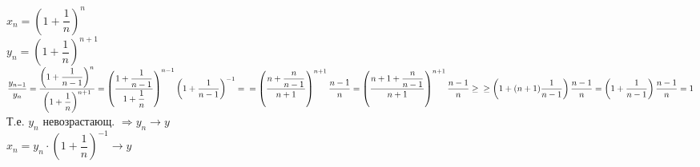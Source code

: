 $ x_n = \left(1 + \dfrac{1}{n}\right)^n $\\
$ y_n =  \left(1 + \dfrac{1}{n}\right)^{n+1} $ \\
$ \dfrac{y_{n-1}}{y_n} = \dfrac{ \left(1 + \dfrac{1}{n-1}\right)^{n}}{ \left(1 + \dfrac{1}{n}\right)^{n+1}} = \left( \dfrac{1+\dfrac{1}{n-1}}{1 + \dfrac{1}{n}} \right)^{n-1} \left( 1 + \dfrac{1}{n-1} \right)^{-1}  = \\ = \left( \dfrac{n+\dfrac{n}{n-1}}{n + 1} \right)^{n+1} \dfrac{n-1}{n}  =  \left( \dfrac{n+1+\dfrac{n}{n-1}}{n + 1} \right)^{n+1} \dfrac{n-1}{n}  \geq \\ \geq \left(1 + (n+1)\dfrac{1}{n-1} \right)\dfrac{n-1}{n} = \left( 1+ \dfrac{1}{n-1} \right) \dfrac{n-1}{n}  = 1$\\
Т.е. $ y_n $ невозрастающ. $ \Rightarrow y_n \rightarrow y$\\
$ x_n = y_n \cdot ( 1 + \dfrac{1}{n})^{-1} \rightarrow y $ \\
